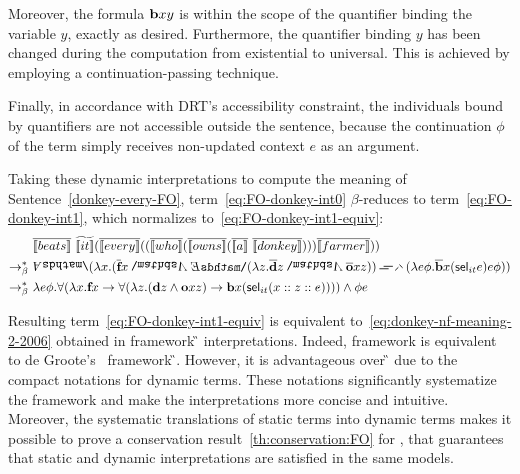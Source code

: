 {Moreover, the formula $\cbeat \x1 \y1 $ is within the scope of the quantifier binding the variable $y$, exactly as desired.  Furthermore, the quantifier binding $y$ has been changed during the computation from existential to universal. This is achieved by employing a continuation-passing technique. 

Finally, in accordance with DRT's accessibility constraint, the individuals bound by quantifiers are not accessible outside the sentence, because the continuation $\phi$ of the term simply receives non-updated context $e$ as an argument.






 Taking these dynamic interpretations to compute the meaning of Sentence~\eqref{donkey-every-FO}, term~\eqref{eq:FO-donkey-int0} $\beta$-reduces to term~\eqref{eq:FO-donkey-int1}, which normalizes to~\eqref{eq:FO-donkey-int1-equiv}:
\begin{align}
& \tr{\I{beats}}  \ \etr{\I{it}} (\tr{\I{every}}  ((\tr{\I{who}}  (\tr{\I{owns}}  (\tr{\I{a}} \ \tr{\I{donkey}} ) ) ) \tr{\I{farmer}}  ))  \label{eq:FO-donkey-int0} \\
\bred \ &  \all2 (\lambda \x1. (\tr{\cfarmer} \x1  \cnj2     \ex2 (\lambda \z1.   \tr{\cdonkey}   \z1  \cnj2      \tr{\textbf{o}}  \x1  \z1 ))    \impK2    (\lambda e \phi. \tr{\textbf{b}}  \x1 ( \selK_{it} e ) e \phi ) )  \label{eq:FO-donkey-int1} \\
\bred \ & \lambda e \phi. \forall (\lambda \x1. \cfarmer \x1  \rightarrow \forall  (\lambda \z1.  (\cdonkey  \z1 \cnj1 \cown  \x1 \z1 )   \rightarrow  \cbeat  \x1 ( \selK_{it}  (\upii{\x1}{\upii{\z1}{e}}) )))\cnj1 \phi e  \label{eq:FO-donkey-int1-equiv}
\end{align}


Resulting term~\eqref{eq:FO-donkey-int1-equiv} is equivalent to~\eqref{eq:donkey-nf-meaning-2-2006} obtained in framework {\G} interpretations. Indeed, framework {\GN} is equivalent to de Groote's~\cite{deGroote:2006:Towards-a-Montagovian-Account-of-Dynamics} framework {\G}. However, it is advantageous over {\G} due to the compact notations for dynamic terms. These notations significantly systematize the framework and make the interpretations more concise and intuitive. Moreover, the systematic translations of static terms into dynamic terms makes it possible to prove a conservation result~\ref{th:conservation:FO} for {\GN}, that guarantees that static and dynamic interpretations are satisfied in the same models. 

}


